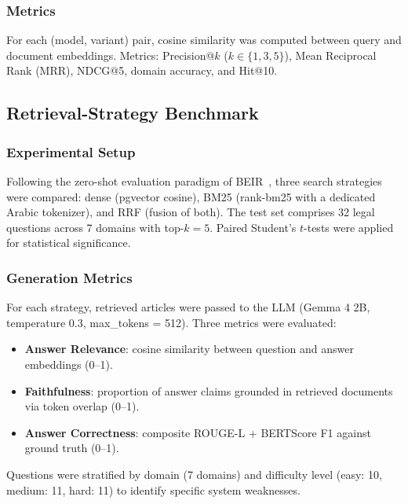 \subsubsection{Metrics}

For each (model, variant) pair, cosine similarity was computed between query
and document embeddings. Metrics: Precision@$k$ ($k \in \{1,3,5\}$), Mean
Reciprocal Rank (MRR), NDCG@5, domain accuracy, and Hit@10.

\subsection{Retrieval-Strategy Benchmark}

\subsubsection{Experimental Setup}

Following the zero-shot evaluation paradigm of
BEIR~\cite{thakur2021hybrid}, three search strategies were compared: dense
(pgvector cosine), BM25 (rank-bm25 with a dedicated Arabic tokenizer), and
RRF (fusion of both). The test set comprises 32 legal questions across 7
domains with top-$k = 5$. Paired Student's $t$-tests were applied for
statistical significance.

\subsubsection{Generation Metrics}

For each strategy, retrieved articles were passed to the LLM (Gemma 4 2B,
temperature 0.3, max\_tokens = 512). Three metrics were evaluated:
\begin{itemize}
  \item \textbf{Answer Relevance}: cosine similarity between question and
        answer embeddings (0--1).
  \item \textbf{Faithfulness}: proportion of answer claims grounded in
        retrieved documents via token overlap (0--1).
  \item \textbf{Answer Correctness}: composite ROUGE-L + BERTScore F1 against
        ground truth (0--1).
\end{itemize}

Questions were stratified by domain (7 domains) and difficulty level
(easy: 10, medium: 11, hard: 11) to identify specific system weaknesses.
